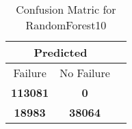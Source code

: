 \begin{table}[] 
\caption{Confusion Matric for RandomForest10} 
\label{Table: Prediction Accuracy-DMDRandomForest10OnlySunEKF-combinationReflectionperfectNoFailurePrediction-Reflection} 
\centering 
\begin{tabular} 
 {@{}ccc@{}} 
\toprule 
\multicolumn{2}{c}{\textbf{Predicted}}
 \\ \midrule 
\multicolumn{1}{|c|}{Failure} & 
\multicolumn{1}{c|}{No Failure}
 \\ \midrule 
\multicolumn{1}{|c|}{\color{green}\textbf{113081}} & 
\multicolumn{1}{c|}{\color{red}\textbf{0}}
 \\ \midrule 
\multicolumn{1}{|c|}{\color{red}\textbf{18983}} & 
\multicolumn{1}{c|}{\color{green}\textbf{38064}}
 \\ \bottomrule 
\end{tabular} 
\end{table} 
